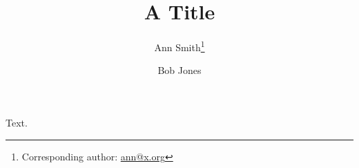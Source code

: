 \documentclass{article}
\begin{document}
\title{A Title}
\author{Ann Smith\thanks{Corresponding author: \href{mailto:ann@x.org}{ann@x.org}} \and Bob Jones}
\maketitle
Text.
\end{document}

